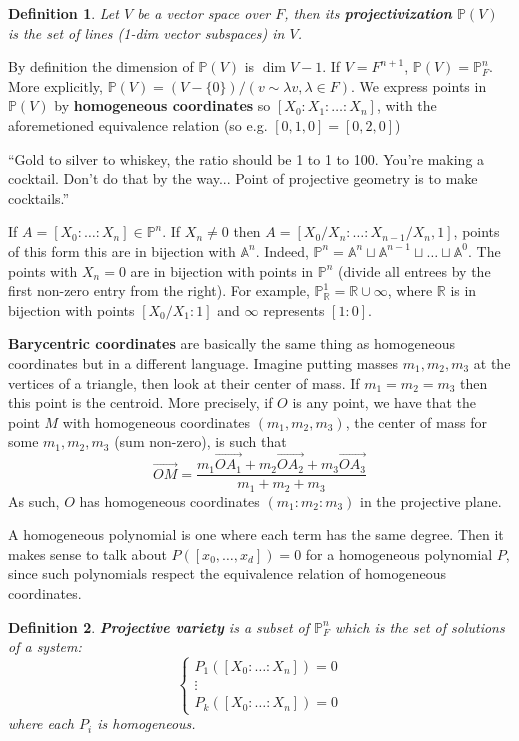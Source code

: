 \documentclass[12pt]{article}
\newcommand{\R}{\mathbb{R}}
\renewcommand{\P}{\mathbb{P}}
\newcommand{\A}{\mathbb{A}}
\renewcommand{\vec}{\overrightarrow}
\newtheorem{definition}{Definition}
\begin{document}
    \begin{definition}
        Let $V$ be a vector space over $F$, then its \textbf{projectivization} $\P(V)$ is the set of lines (1-dim vector subspaces) in $V$. 
    \end{definition}
    By definition the dimension of $\P(V)$ is $\dim V - 1$. If $V = F^{n+1}$, $\P(V) = \P_F^n$. More explicitly, $\P(V) = (V - \{0\})/(v \sim \lambda v, \lambda \in F)$. 
    We express points in $\P(V)$ by \textbf{homogeneous coordinates} so $[X_0: X_1 : \dots : X_n]$, with the aforemetioned equivalence relation (so e.g. $[0, 1, 0] = [0, 2, 0]$) \par 
    ``Gold to silver to whiskey, the ratio should be 1 to 1 to 100. You're making a cocktail. Don't do that by the way... Point of projective geometry is to make cocktails.''\par 
    If $A = [X_0: \dots :X_n] \in \P^n$. If $X_n \neq 0$ then $A = [X_0/X_n: \dots : X_{n-1}/X_n, 1]$, points of this form this are in bijection with $\A^n$. Indeed, $\P^n = \A^n \sqcup \A^{n-1} \sqcup \dots \sqcup \A^0$. The points with $X_n = 0$ are in bijection with points in $\P^n$ (divide all entrees by the first non-zero entry from the right). For example, $\P_\R^1 = \R \cup \infty$, where $\R$ is in bijection with points $[X_0/X_1:1]$ and $\infty$ represents $[1:0]$.  \par 
    \textbf{Barycentric coordinates} are basically the same thing as homogeneous coordinates but in a different language. Imagine putting masses $m_1, m_2, m_3$ at the vertices of a triangle, then look at their center of mass. If $m_1 = m_2 = m_3$ then this point is the centroid. More precisely, if $O$ is any point, we have that the point $M$ with homogeneous coordinates $(m_1, m_2, m_3)$, the center of mass for some $m_1, m_2, m_3$ (sum non-zero), is such that
    $$\vec{OM} = \frac{m_1\vec{OA_1} + m_2\vec{OA_2} + m_3\vec{OA_3}}{m_1 + m_2 + m_3}$$
    As such, $O$ has homogeneous coordinates $(m_1:m_2:m_3)$ in the projective plane.  \par 
    A homogeneous polynomial is one where each term has the same degree. Then it makes sense to talk about $P([x_0, \dots, x_d]) = 0$ for a homogeneous polynomial $P$, since such polynomials respect the equivalence relation of homogeneous coordinates. 
    \begin{definition}
        \textbf{Projective variety} is a subset of $\P_F^n$ which is the set of solutions of a system:
        $$\begin{cases}
            P_1([X_0: \dots : X_n]) = 0 \\ 
            \vdots \\
            P_k([X_0: \dots : X_n]) = 0
        \end{cases}$$
        where each $P_i$ is homogeneous. 
    \end{definition}
\end{document}
